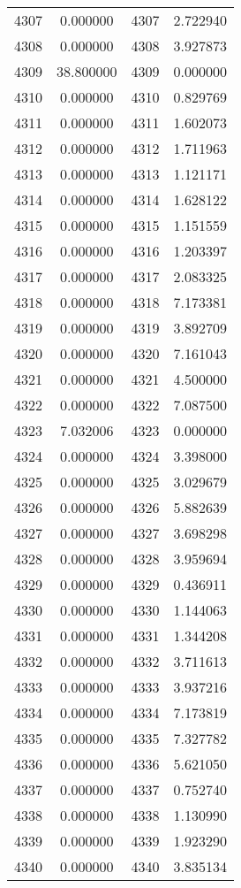 \documentclass[12pt]{article}
\begin{document}
\begin{longtable}{@{}cccc@{}}
4307 & 0.000000 & 4307 & 2.722940 \\
4308 & 0.000000 & 4308 & 3.927873 \\
4309 & 38.800000 & 4309 & 0.000000 \\
4310 & 0.000000 & 4310 & 0.829769 \\
4311 & 0.000000 & 4311 & 1.602073 \\
4312 & 0.000000 & 4312 & 1.711963 \\
4313 & 0.000000 & 4313 & 1.121171 \\
4314 & 0.000000 & 4314 & 1.628122 \\
4315 & 0.000000 & 4315 & 1.151559 \\
4316 & 0.000000 & 4316 & 1.203397 \\
4317 & 0.000000 & 4317 & 2.083325 \\
4318 & 0.000000 & 4318 & 7.173381 \\
4319 & 0.000000 & 4319 & 3.892709 \\
4320 & 0.000000 & 4320 & 7.161043 \\
4321 & 0.000000 & 4321 & 4.500000 \\
4322 & 0.000000 & 4322 & 7.087500 \\
4323 & 7.032006 & 4323 & 0.000000 \\
4324 & 0.000000 & 4324 & 3.398000 \\
4325 & 0.000000 & 4325 & 3.029679 \\
4326 & 0.000000 & 4326 & 5.882639 \\
4327 & 0.000000 & 4327 & 3.698298 \\
4328 & 0.000000 & 4328 & 3.959694 \\
4329 & 0.000000 & 4329 & 0.436911 \\
4330 & 0.000000 & 4330 & 1.144063 \\
4331 & 0.000000 & 4331 & 1.344208 \\
4332 & 0.000000 & 4332 & 3.711613 \\
4333 & 0.000000 & 4333 & 3.937216 \\
4334 & 0.000000 & 4334 & 7.173819 \\
4335 & 0.000000 & 4335 & 7.327782 \\
4336 & 0.000000 & 4336 & 5.621050 \\
4337 & 0.000000 & 4337 & 0.752740 \\
4338 & 0.000000 & 4338 & 1.130990 \\
4339 & 0.000000 & 4339 & 1.923290 \\
4340 & 0.000000 & 4340 & 3.835134 \\

\end{longtable}
\end{document}
